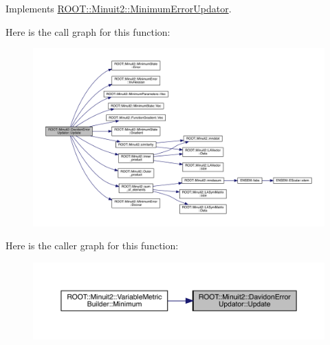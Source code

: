 Implements \mbox{\hyperlink{classROOT_1_1Minuit2_1_1MinimumErrorUpdator_ae75c33152c49ebf34e6119adc0bbbda9}{R\+O\+O\+T\+::\+Minuit2\+::\+Minimum\+Error\+Updator}}.

Here is the call graph for this function\+:\nopagebreak
\begin{figure}[H]
\begin{center}
\leavevmode
\includegraphics[width=350pt]{d1/d0a/classROOT_1_1Minuit2_1_1DavidonErrorUpdator_afad671aa523cbd9f17af376c51c3ce97_cgraph}
\end{center}
\end{figure}
Here is the caller graph for this function\+:\nopagebreak
\begin{figure}[H]
\begin{center}
\leavevmode
\includegraphics[width=350pt]{d1/d0a/classROOT_1_1Minuit2_1_1DavidonErrorUpdator_afad671aa523cbd9f17af376c51c3ce97_icgraph}
\end{center}
\end{figure}
\mbox{\label{classROOT_1_1Minuit2_1_1DavidonErrorUpdator_aae088602f78dc3bee91f7ce2534311e9}} 
